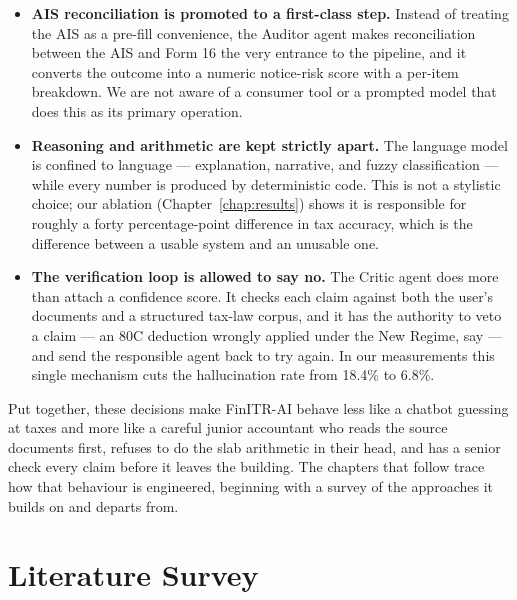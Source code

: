 \documentclass[12pt, a4paper, oneside]{report}
\begin{document}
\begin{itemize}
    \item \textbf{AIS reconciliation is promoted to a first-class step.}
          Instead of treating the AIS as a pre-fill convenience, the Auditor
          agent makes reconciliation between the AIS and Form 16 the very
          entrance to the pipeline, and it converts the outcome into a numeric
          notice-risk score with a per-item breakdown. We are not aware of a
          consumer tool or a prompted model that does this as its primary
          operation.
    \item \textbf{Reasoning and arithmetic are kept strictly apart.} The
          language model is confined to language --- explanation, narrative, and
          fuzzy classification --- while every number is produced by
          deterministic code. This is not a stylistic choice; our ablation
          (Chapter~\ref{chap:results}) shows it is responsible for roughly a
          forty percentage-point difference in tax accuracy, which is the
          difference between a usable system and an unusable one.
    \item \textbf{The verification loop is allowed to say no.} The Critic agent
          does more than attach a confidence score. It checks each claim against
          both the user's documents and a structured tax-law corpus, and it has
          the authority to veto a claim --- an 80C deduction wrongly applied
          under the New Regime, say --- and send the responsible agent back to
          try again. In our measurements this single mechanism cuts the
          hallucination rate from 18.4\% to 6.8\%.
\end{itemize}

Put together, these decisions make FinITR-AI behave less like a chatbot
guessing at taxes and more like a careful junior accountant who reads the source
documents first, refuses to do the slab arithmetic in their head, and has a
senior check every claim before it leaves the building. The chapters that follow
trace how that behaviour is engineered, beginning with a survey of the
approaches it builds on and departs from.



\chapter{Literature Survey}
\label{chap:literature}
\end{document}
